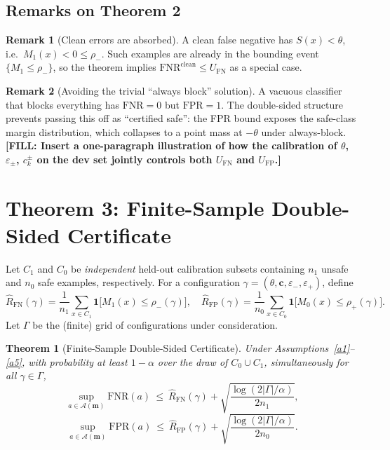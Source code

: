 \documentclass[11pt]{article}
\newcommand{\TODO}[1]{{\color{red}\textbf{[FILL: #1]}}}
\theoremstyle{plain}
\newtheorem{theorem}{Theorem}
\theoremstyle{definition}
\newtheorem{remark}{Remark}
\begin{document}
\subsection{Remarks on Theorem 2}

\begin{remark}[Clean errors are absorbed]
A clean false negative has $S(x) < \theta$, i.e.\ $M_1(x) < 0 \le \rho_-$. Such examples are already in
the bounding event $\{M_1 \le \rho_-\}$, so the theorem implies $\mathrm{FNR}^{\mathrm{clean}} \le U_{\mathrm{FN}}$
as a special case.
\end{remark}

\begin{remark}[Avoiding the trivial ``always block'' solution]
A vacuous classifier that blocks everything has $\mathrm{FNR} = 0$ but $\mathrm{FPR} = 1$.
The double-sided structure prevents passing this off as ``certified safe'': the FPR bound
exposes the safe-class margin distribution, which collapses to a point mass at $-\theta$ under always-block.
\TODO{Insert a one-paragraph illustration of how the calibration of $\theta$, $\varepsilon_\pm$, $c_k^\pm$
on the dev set jointly controls both $U_{\mathrm{FN}}$ and $U_{\mathrm{FP}}$.}
\end{remark}

\section{Theorem 3: Finite-Sample Double-Sided Certificate}

Let $C_1$ and $C_0$ be \emph{independent} held-out calibration subsets containing $n_1$ unsafe and $n_0$ safe
examples, respectively. For a configuration $\gamma = (\theta, \mathbf c, \varepsilon_-, \varepsilon_+)$, define
\[
\widehat R_{\mathrm{FN}}(\gamma) = \frac{1}{n_1} \sum_{x \in C_1} \mathbf{1}\!\big[M_1(x) \le \rho_-(\gamma)\big],
\quad
\widehat R_{\mathrm{FP}}(\gamma) = \frac{1}{n_0} \sum_{x \in C_0} \mathbf{1}\!\big[M_0(x) \le \rho_+(\gamma)\big].
\]
Let $\Gamma$ be the (finite) grid of configurations under consideration.

\begin{theorem}[Finite-Sample Double-Sided Certificate]\label{thm:3}
Under Assumptions~\ref{a1}--\ref{a5}, with probability at least $1 - \alpha$ over the draw of $C_0 \cup C_1$, simultaneously for all $\gamma \in \Gamma$,
\[
\sup_{a \in \mathcal A(\mathbf m)} \mathrm{FNR}(a)
   \ \le\ \widehat R_{\mathrm{FN}}(\gamma) + \sqrt{\frac{\log(2|\Gamma|/\alpha)}{2 n_1}},
\]
\[
\sup_{a \in \mathcal A(\mathbf m)} \mathrm{FPR}(a)
   \ \le\ \widehat R_{\mathrm{FP}}(\gamma) + \sqrt{\frac{\log(2|\Gamma|/\alpha)}{2 n_0}}.
\]
\end{theorem}
\end{document}
